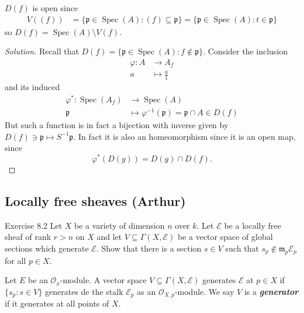 \begin{remark}\leavevmode
	$D(f)$ is open since
	 \begin{align*}
		V((f))&=\{\mathfrak{p}\in\operatorname{Spec}(A):(f) \subseteq \mathfrak{p}\} = \{\mathfrak{p}\in\operatorname{Spec}(A) :t\in\mathfrak{p}\}
	\end{align*}
	so $D(f)=\operatorname{Spec}(A) \setminus V(f)$.
\end{remark}

\begin{proof}[Solution]\leavevmode
	Recall that $D(f)=\{\mathfrak{p}\in\operatorname{Spec}(A) : f\not\in\mathfrak{p}\}$. Consider the inclusion
	\begin{align*}
		\varphi: A &\longrightarrow A_f \\
		a &\longmapsto \frac{a}{1}
	\end{align*}
	and its induced
	\begin{align*}
		\varphi^*: \operatorname{Spec}(A_f) &\longrightarrow \operatorname{Spec}(A) \\
		\mathfrak{p} &\longmapsto \varphi^{-1}(\mathfrak{p})=\mathfrak{p}\cap A\in D(f)
	\end{align*}
	But such a function is in fact a bijection with inverse given by $D(f)\ni \mathfrak{p}\mapsto S^{-1}\mathfrak{p}$. In fact it is also an homeomorphism since it is an open map, since
	\[\varphi^* (D(g))=D(g)\cap D(f).\]
	
\end{proof}

\subsection{Locally free sheaves (Arthur)}

\begin{thing4}{Exercise 8.2}\leavevmode
	Let $X$ be a variety of dimension $n$ over $k$. Let $\mathcal{E}$ be a locally free sheaf of rank $r>n$ on  $X$ and let $V\subseteq \Gamma(X,\mathcal{E})$ be a vector space of global sections which generate $\mathcal{E}$. Show that there is a section $s\in V$ such that $s_p \not\in \mathfrak{m}_p\mathcal{E}_p$ for all $p\in X$.
\end{thing4}

\begin{defn}\leavevmode
	Let $E$ be an  $\mathcal{O}_x$-module. A vector space $V\subseteq \Gamma(X,\mathcal{E})$ generates $\mathcal{E}$ at $p\in X$ if $\{s_p:s\in V\}$ generates de the stalk $\mathcal{E}_p$ as an $\mathcal{O}_{X,p}$-module. We say $V$ is a \textit{\textbf{generator}} if it generates at all points of $X$.
\end{defn}

